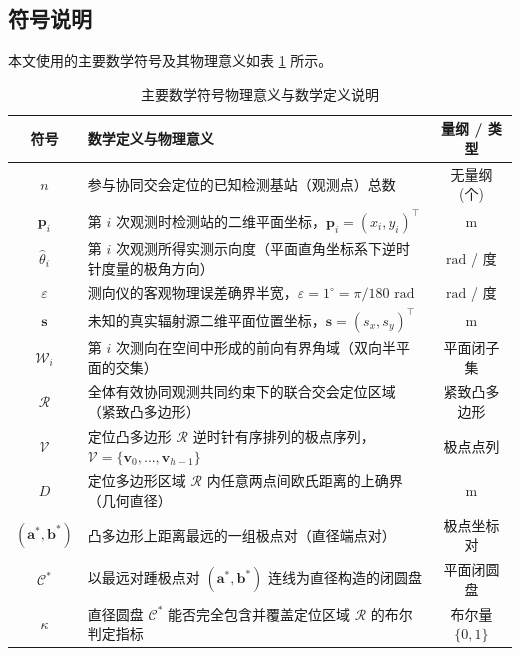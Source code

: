\documentclass[zihao=-4,a4paper,UTF8]{ctexart}
\begin{document}
\subsection{符号说明}
本文使用的主要数学符号及其物理意义如表 \ref{tab:symbols} 所示。

\begin{table}[htbp]
    \centering
    \small
    \caption{主要数学符号物理意义与数学定义说明}
    \label{tab:symbols}
    \begin{tabularx}{\linewidth}{c X c}
        \toprule[1.5pt]
        \textbf{符号} & \textbf{数学定义与物理意义} & \textbf{量纲 / 类型} \\
        \midrule
        $n$ & 参与协同交会定位的已知检测基站（观测点）总数 & 无量纲 (个) \\
        $\mathbf{p}_i$ & 第 $i$ 次观测时检测站的二维平面坐标，$\mathbf{p}_i = (x_i, y_i)^\top$ & $\text{m}$ \\
        $\hat\theta_i$ & 第 $i$ 次观测所得实测示向度（平面直角坐标系下逆时针度量的极角方向） & $\text{rad}$ / 度 \\
        $\varepsilon$ & 测向仪的客观物理误差确界半宽，$\varepsilon = 1^\circ = \pi/180\text{ rad}$ & $\text{rad}$ / 度 \\
        $\mathbf{s}$ & 未知的真实辐射源二维平面位置坐标，$\mathbf{s} = (s_x, s_y)^\top$ & $\text{m}$ \\
        $\mathcal{W}_i$ & 第 $i$ 次测向在空间中形成的前向有界角域（双向半平面的交集） & 平面闭子集 \\
        $\mathcal{R}$ & 全体有效协同观测共同约束下的联合交会定位区域（紧致凸多边形） & 紧致凸多边形 \\
        $\mathcal{V}$ & 定位凸多边形 $\mathcal{R}$ 逆时针有序排列的极点序列，$\mathcal{V} = \{\mathbf{v}_0, \dots, \mathbf{v}_{h-1}\}$ & 极点点列 \\
        $D$ & 定位多边形区域 $\mathcal{R}$ 内任意两点间欧氏距离的上确界（几何直径） & $\text{m}$ \\
        $(\mathbf{a}^*, \mathbf{b}^*)$ & 凸多边形上距离最远的一组极点对（直径端点对） & 极点坐标对 \\
        $\mathcal{C}^*$ & 以最远对踵极点对 $(\mathbf{a}^*, \mathbf{b}^*)$ 连线为直径构造的闭圆盘 & 平面闭圆盘 \\
        $\kappa$ & 直径圆盘 $\mathcal{C}^*$ 能否完全包含并覆盖定位区域 $\mathcal{R}$ 的布尔判定指标 & 布尔量 $\{0, 1\}$ \\
        \bottomrule[1.5pt]
    \end{tabularx}
\end{table}
\end{document}
